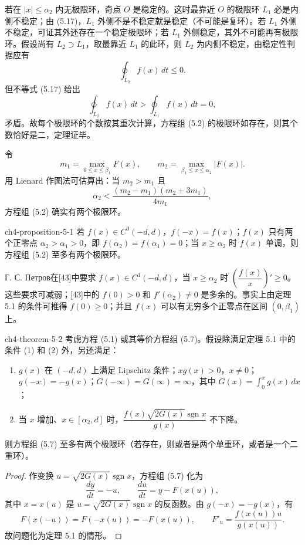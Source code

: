 若在 $|x|\leqslant\alpha_2$ 内无极限环，奇点 $O$ 是稳定的。这时最靠近 $O$ 的极限环 $L_1$ 必是内侧不稳定；由 (5.17)，$L_1$ 外侧不是不稳定就是稳定（不可能是复环）。若 $L_1$ 外侧不稳定，可证其外还存在一个稳定极限环；若 $L_1$ 外侧稳定，其外不可能再有极限环。假设尚有 $L_2\supset L_1$，取最靠近 $L_1$ 的此环，则 $L_2$ 为内侧不稳定，由稳定性判据应有
\[
\oint_{L_2}f(x)\,dt\leqslant0.
\]
但不等式 (5.17) 给出
\[
\oint_{L_2}f(x)\,dt>\oint_{L_1}f(x)\,dt=0,
\]
矛盾。故每个极限环的个数按其重次计算，方程组 (5.2) 的极限环如存在，则其个数恰好是二，定理证毕。

令
\[
m_1=\max_{0\leqslant x\leqslant\beta_1}F(x),\qquad
m_2=\max_{\beta_1\leqslant x\leqslant\alpha_2}|F(x)|.
\]
用 Lienard 作图法可估算出：当 $m_2>m_1$ 且
\[
\alpha_2<\dfrac{(m_2-m_1)(m_2+3m_1)}{4m_1},
\]
方程组 (5.2) 确实有两个极限环。

\begin{proposition}{ }{ch4-proposition-5-1}
若 $f(x)\in C^0(-d,d)$，$f(-x)=f(x)$；$f(x)$ 只有两个正零点 $\alpha_2>\alpha_1>0$，即 $f(\alpha_2)=f(\alpha_1)=0$；当 $x\geqslant\alpha_2$ 时 $f(x)$ 单调，则方程组 (5.2) 至多有两个极限环。
\end{proposition}

Г. С. Петров在[43]中要求 $f(x)\in C^1(-d,d)$，当 $x\geqslant\alpha_2$ 时 $\left(\dfrac{f(x)}x\right)'\geqslant0$。这些要求可减弱；[43]中的 $f(0)>0$ 和 $f'(\alpha_2)\ne0$ 是多余的。事实上由定理 5.1 的条件可推得 $f(0)\geqslant0$；并且 $f(x)$ 可以有无穷多个正零点在区间 $(0,\beta_1)$ 上。

\begin{theorem}{ }{ch4-theorem-5-2}
考虑方程 (5.1) 或其等价方程组 (5.7)。假设除满足定理 5.1 中的条件 (1) 和 (2) 外，另还满足：
\begin{enumerate}
  \item $g(x)$ 在 $(-d,d)$ 上满足 Lipschitz 条件；$xg(x)>0$，$x\ne0$；$g(-x)=-g(x)$；$G(-\infty)=G(\infty)=\infty$，其中 $G(x)=\int_0^xg(x)\,dx$；
  \item 当 $x$ 增加、$x\in[\alpha_2,d]$ 时，$\dfrac{f(x)\sqrt{2G(x)}\operatorname{sgn}x}{g(x)}$ 不下降。
\end{enumerate}
则方程组 (5.7) 至多有两个极限环（若存在，则或者是两个单重环，或者是一个二重环）。
\end{theorem}

\begin{proof}
作变换 $u=\sqrt{2G(x)}\operatorname{sgn}x$，方程组 (5.7) 化为
\[
\dfrac{dy}{dt}=-u,\qquad \dfrac{du}{dt}=y-F(x(u)),
\]
其中 $x=x(u)$ 是 $u=\sqrt{2G(x)}\operatorname{sgn}x$ 的反函数。由 $g(-x)=-g(x)$，有
\[
F(x(-u))=F(-x(u))=-F(x(u)),\qquad
F'_u=\dfrac{f(x(u))u}{g(x(u))}.
\]
故问题化为定理 5.1 的情形。
\end{proof}

